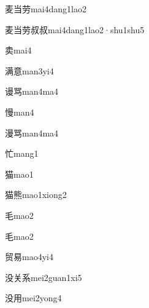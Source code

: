 \begin{verbete*}[7;6;7]{麦当劳}{mai4dang1lao2}
\end{verbete*}
\begin{verbete*}[7;6;7;8;8]{麦当劳叔叔}{mai4dang1lao2·shu1shu5}
\end{verbete*}
\begin{verbete}[8]{卖}{mai4}
\end{verbete}
\begin{verbete}[13;13]{满意}{man3yi4}
\end{verbete}
\begin{verbete}[13;9]{谩骂}{man4ma4}
\end{verbete}
\begin{verbete}[14]{慢}{man4}
\end{verbete}
\begin{verbete}[14;9]{漫骂}{man4ma4}
\end{verbete}
\begin{verbete}[6]{忙}{mang1}
\end{verbete}
\begin{verbete}[11]{猫}{mao1}
\end{verbete}
\begin{verbete}[11;14]{猫熊}{mao1xiong2}
\end{verbete}
\begin{verbete}[4]{毛}{mao2}
\end{verbete}
\begin{verbete*}[4]{毛}{mao2}
\end{verbete*}
\begin{verbete}[9;8]{贸易}{mao4yi4}
\end{verbete}
\begin{verbete}[7;6;7]{没关系}{mei2guan1xi5}
\end{verbete}
\begin{verbete}[7;5]{没用}{mei2yong4}
\end{verbete}
